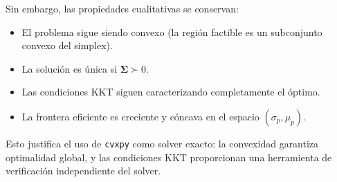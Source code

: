 Sin embargo, las propiedades cualitativas se conservan:
\begin{itemize}
    \item El problema sigue siendo convexo (la región factible es un
          subconjunto convexo del simplex).
    \item La solución es única si $\boldsymbol{\Sigma} \succ 0$.
    \item Las condiciones KKT siguen caracterizando completamente el
          óptimo.
    \item La frontera eficiente es creciente y cóncava en el espacio
          $(\sigma_p, \mu_p)$.
\end{itemize}

Esto justifica el uso de \texttt{cvxpy} como solver exacto: la convexidad
garantiza optimalidad global, y las condiciones KKT proporcionan una
herramienta de verificación independiente del solver.
